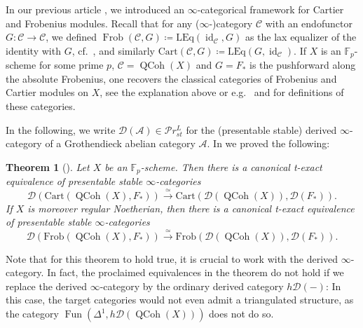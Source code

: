 \documentclass{article}
\theoremstyle{definition}
\theoremstyle{definition}
\theoremstyle{definition}
\theoremstyle{plain}
\theoremstyle{plain}
\theoremstyle{plain}
\theoremstyle{plain}
\theoremstyle{plain}
\newtheorem*{thm*}{Theorem}
\theoremstyle{plain}
\theoremstyle{plain}
\theoremstyle{plain}
\theoremstyle{remark}
\theoremstyle{remark}
\theoremstyle{plain}
\theoremstyle{plain}
\theoremstyle{plain}
\theoremstyle{plain}
\theoremstyle{plain}
\newcommand{\Fp}{\mathbb{F}_p}
\newcommand{\id}[1]{\operatorname{id}_{#1}}
\newcommand{\QCoh}[1]{\operatorname{QCoh}(#1)}
\newcommand{\Frob}[2]{\operatorname{Frob}(#1, #2)}
\newcommand{\Cat}[1]{\mathcal{#1}}
\newcommand{\Fun}[2]{\operatorname{Fun}({#1},{#2})}
\newcommand{\PrSt}{\mathcal{P}r^{L}_{st}}
\begin{document}
In our previous article \cite{cartmod}, we introduced an $\infty$-categorical framework
for Cartier and Frobenius modules.
Recall that for any {($\infty$-)category} $\Cat C$ with an endofunctor $G \colon \Cat C \to \Cat C$,
we defined $\Frob{\Cat C}{G} \coloneqq \mathrm{LEq}(\id{\Cat C}, G)$ as the lax equalizer 
of the identity with $G$, cf.\ \cite[Definition 2.4]{cartmod}, and similarly 
$\mathrm{Cart}(\Cat C,G) \coloneqq \mathrm{LEq}(G, \id{\Cat C})$.
If $X$ is an $\Fp$-scheme for some prime $p$, 
$\Cat C = \QCoh{X}$ and $G = F_*$ is the pushforward along the absolute Frobenius,
one recovers the classical categories of Frobenius and Cartier modules on $X$, see the explanation above or e.g.\ \cite[Remark 1.3.2]{bhatt2017riemannhilbertcorrespondencepositivecharacteristic} 
and \cite[Definition 2.1]{blickle2011cartier} for definitions of these categories. 

In the following, we write $\Cat D(\Cat A) \in \PrSt$ 
for the (presentable stable) derived $\infty$-category of a Grothendieck abelian category $\Cat A$.
In \cite{cartmod} we proved the following:
\begin{thm*}[{\cite[Corollaries 6.2 and 6.3]{cartmod}}]
    Let $X$ be an $\Fp$-scheme. Then there is a canonical t-exact equivalence of presentable stable $\infty$-categories 
    \begin{equation*}
        \Cat D(\mathrm{Cart}(\QCoh{X}, F_*)) \xrightarrow{\simeq} \mathrm{Cart}(\Cat D(\QCoh{X}), \Cat D(F_*)).
    \end{equation*}
    If $X$ is moreover regular Noetherian, then there is a canonical t-exact equivalence of presentable stable $\infty$-categories 
    \begin{equation*}
        \Cat D(\mathrm{Frob}(\QCoh{X}, F_*)) \xrightarrow{\simeq} \mathrm{Frob}(\Cat D(\QCoh{X}), \Cat D(F_*)).
    \end{equation*}
\end{thm*}

Note that for this theorem to hold true, it is crucial to work with the derived $\infty$-category.
In fact, the proclaimed equivalences in the theorem do not hold if we replace the derived $\infty$-category by the ordinary derived category $h\Cat D(-)$:
In this case, the target categories would not even admit a triangulated structure, as the category $\Fun{\Delta^1}{h\Cat D(\QCoh{X})}$ does not do so. 
\end{document}
